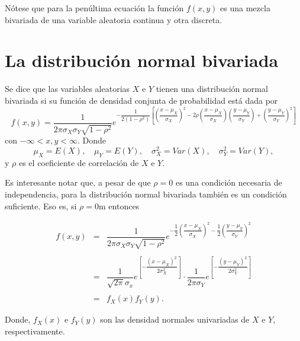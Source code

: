 Nótese que para la penúltima ecuación la función $f(x,y)$ es una mezcla bivariada de una variable aleatoria continua y otra discreta.


\section{La distribución normal bivariada}

\begin{def.}
    Se dice que las variables aleatorias $X$ e $Y$ tienen una distribución normal bivariada si su función de densidad conjunta de probabilidad está dada por
    $$f(x,y)=\dfrac{1}{2\pi\sigma_X \sigma_Y\sqrt{1-\rho^2}}e^{-\dfrac{1}{2(1-\rho^2)}\left[\left(\dfrac{x-\mu_X}{\sigma_X}\right)^2-2\rho \left(\dfrac{x-\mu_X}{\sigma_X}\right)\left(\dfrac{y-\mu_Y}{\sigma_Y}\right)+\left(\dfrac{y-\mu_Y}{\sigma_Y}\right)^2\right]}$$
    con $-\infty < x,y<\infty$. Donde
    $$\mu_X = E(X),\quad \mu_Y=E(Y),\quad \sigma_X^2 = Var(X),\quad \sigma_Y^2 = Var(Y),$$
    y $\rho$ es el coeficiente de correlación de $X$ e $Y$.
\end{def.}

Es interesante notar que, a pesar de que $\rho=0$ es una condición necesaria de independencia, para la distribución normal bivariada también es un condición suficiente. Eso es, si $\rho=0$m entonces
\begin{tcolorbox}
    $$\begin{array}{rcl}
	f(x,y)&=&\dfrac{1}{2\pi\sigma_X \sigma_Y\sqrt{1-\rho^2}}e^{-\dfrac{1}{2}\left(\dfrac{x-\mu_X}{\sigma_X}\right)^2-\dfrac{1}{2}\left(\dfrac{y-\mu_Y}{\sigma_Y}\right)^2}\\\\
	      &=&\dfrac{1}{\sqrt{2\pi}\sigma_x} e^{\left[-\dfrac{(x-\mu_X)^2}{2\sigma^2_X}\right]}\cdot \dfrac{1}{2\pi\sigma_Y} e^{\left[-\dfrac{(y-\mu_Y)^2}{2\sigma^2_Y}\right]}\\\\
	      &=&f_X(x)f_Y(y).
    \end{array}$$
\end{tcolorbox}

Donde, $f_X(x)$ e $f_Y(y)$ son las  densidad normales univariadas de $X$ e $Y$, respectivamente.\\\\




